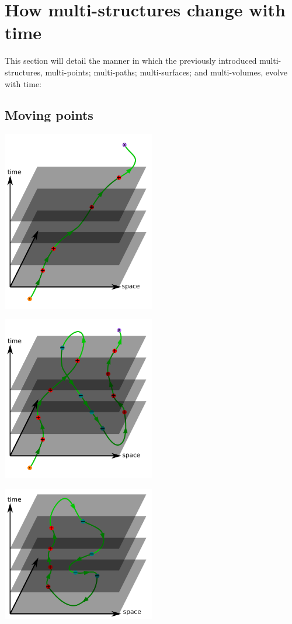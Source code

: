 \section{How multi-structures change with time}

This section will detail the manner in which the previously introduced multi-structures, multi-points; multi-paths; multi-surfaces; and multi-volumes, evolve with time:


\subsection{Moving points}

\includegraphics[width = 0.5\textwidth]{Time/world_lines}

\includegraphics[width = 0.5\textwidth]{Time/world_lines_2}

\includegraphics[width = 0.5\textwidth]{Time/world_lines_3}

